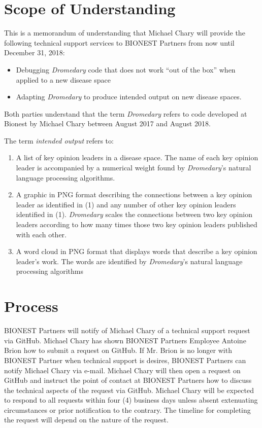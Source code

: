 \documentclass[a4paper,11pt]{texMemo}
\begin{document}
\maketitle

\section*{Scope of Understanding}
  This is a memorandum of understanding that Michael Chary will provide the following technical support services to BIONEST Partners from now until December 31, 2018:
  
  \begin{itemize}
	\item Debugging \emph{Dromedary} code that does not work ``out of the box'' when applied to a new disease space
    \item Adapting \emph{Dromedary} to produce intended output on new disease spaces. 
  \end{itemize}
  
  Both parties understand that the term \emph{Dromedary} refers to code developed at Bionest by Michael Chary between August 2017 and August 2018.  
  
   The term \emph{intended output} refers to:
   \begin{enumerate}
     \item A list of key opinion leaders in a disease space. The name of each key opinion leader is accompanied by a numerical weight found by \emph{Dromedary}'s natural language processing algorithms. 
     \item A graphic in PNG format describing the connections between a key opinion leader as identified in (1) and any number of other key opinion leaders identified in (1). \emph{Dromedary} scales the connections between two key opinion leaders according to how many times those two key opinion leaders published with each other. 
     \item A word cloud in PNG format that displays words that describe a key opinion leader's work. The words are identified by \emph{Dromedary}'s natural language processing algorithms
    \end{enumerate}

\section*{Process}
   BIONEST Partners will notify of Michael Chary of a technical support request via GitHub. Michael Chary has shown BIONEST Partners Employee Antoine Brion how to submit a request on GitHub. If Mr. Brion is no longer with BIONEST Partner when technical support is desires, BIONEST Partners can notify Michael Chary via e-mail. Michael Chary will then open a request on GitHub and instruct the point of contact at BIONEST Partners how to discuss the technical aspects of the request via GitHub.
   Michael Chary will be expected to respond to all requests within four (4) business days unless absent extenuating circumstances or prior notification to the contrary. The timeline for completing the request will depend on the nature of the request. 
\end{document}
